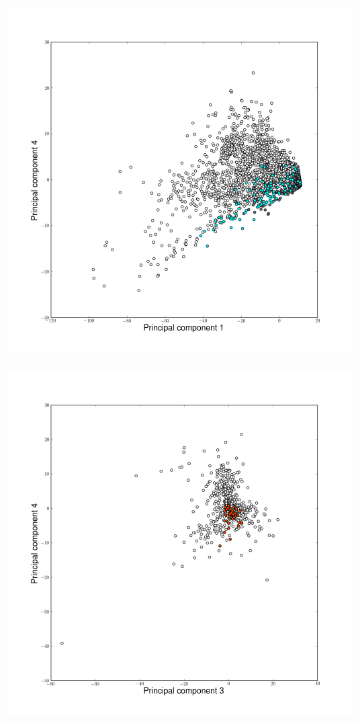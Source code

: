 \begin{landscape}
\begin{figure}
\begin{flushleft}
\begin{subfigure}[t]{0.42\textwidth}
	\end{subfigure}
	\begin{subfigure}[t]{0.42\textwidth}
	\includegraphics[width=1\textwidth]{./img/PCAcoor03.png}
	\end{subfigure}
	\begin{subfigure}[t]{0.42\textwidth}
	\includegraphics[width=1\textwidth]{./img/PCAncoor23.png}

\end{subfigure}
\end{flushleft}
\end{figure}
\end{landscape}

